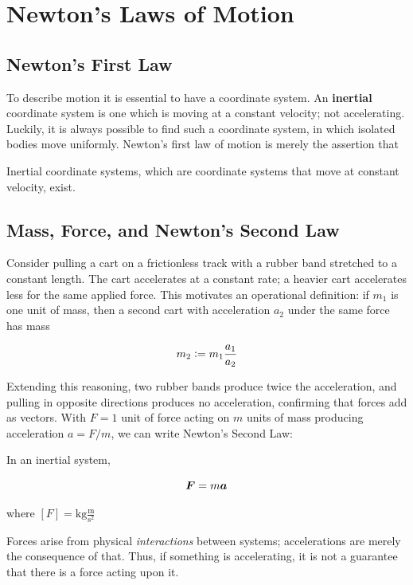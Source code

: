 \documentclass[openany,oneside]{book}
\begin{document}
\chapter{Newton's Laws of Motion}

\section{Newton's First Law}

To describe motion it is essential to have a coordinate system. An \textbf{inertial} coordinate system is one which is moving at a constant velocity; not accelerating. 
Luckily, it is always possible to find such a coordinate system, in which isolated bodies move uniformly. Newton's first law of motion 
is merely the assertion that

\begin{fact}
    Inertial coordinate systems, which are coordinate systems that move at constant velocity, exist.  
\end{fact}

\section{Mass, Force, and Newton's Second Law}

Consider pulling a cart on a frictionless track with a rubber band stretched to a constant length. The cart accelerates at a constant rate; a heavier cart accelerates less for the same applied force. This motivates an operational definition: if $m_1$ is one unit of mass, then a second cart with acceleration $a_2$ under the same force has mass

\[
    m_2 \vcentcolon= m_1 \frac{a_1}{a_2}
\]

Extending this reasoning, two rubber bands produce twice the acceleration, and pulling in opposite directions produces no acceleration, confirming that forces add as vectors. With $F = 1$ unit of force acting on $m$ units of mass producing acceleration $a = F/m$, we can write Newton's Second Law:

\begin{fact}
    In an inertial system, 

    \[
        \vect{F} = m\lvect{a} 
    \]

    where $[F] = \text{kg}\frac{\text{m}}{\text{s}^2}$
\end{fact}

Forces arise from physical \textit{interactions} between systems; accelerations are merely the consequence of that. 
Thus, if something is accelerating, it is not a guarantee that there is a force acting upon it. 
\end{document}
